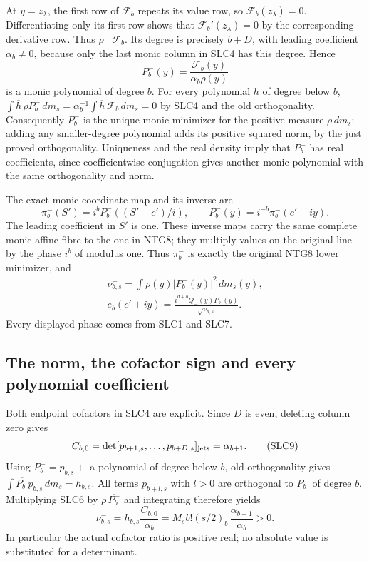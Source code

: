 \documentclass[11pt,a4paper]{article}
\begin{document}
At $y=z_\lambda$, the first row of $\mathcal F_b$ repeats its
value row, so $\mathcal F_b(z_\lambda)=0$. Differentiating only
its first row shows that $\mathcal F_b'(z_\lambda)=0$ by the
corresponding derivative row. Thus $\rho\mid \mathcal F_b$.
Its degree is precisely $b+D$, with leading coefficient
$\alpha_b\ne0$, because only the last monic column in
SLC4 has this degree. Hence
\[
                 P_b^-(y)=\frac{\mathcal F_b(y)}{\alpha_b\rho(y)}
                                                               \tag{SLC6}
\]
is a monic polynomial of degree $b$. For every polynomial
$h$ of degree below $b$,
$\int\overline h\,\rho P_b^-\,dm_s
=\alpha_b^{-1}\int\overline h\,\mathcal F_b\,dm_s=0$
by SLC4 and the old orthogonality. Consequently
$P_b^-$ is the unique monic minimizer for the positive
measure $\rho\,dm_s$: adding any smaller-degree polynomial
adds its positive squared norm, by the just proved
orthogonality. Uniqueness and the real density imply that
$P_b^-$ has real coefficients, since coefficientwise
conjugation gives another monic polynomial with the
same orthogonality and norm.

The exact monic coordinate map and its inverse are
\[
 \pi_b^-(S')=i^bP_b^-((S'-c')/i),\qquad
 P_b^-(y)=i^{-b}\pi_b^-(c'+iy).
                                                               \tag{SLC7}
\]
The leading coefficient in $S'$ is one. These inverse
maps carry the same complete monic affine fibre to the
one in NTG8; they multiply values on the original line
by the phase $i^b$ of modulus one. Thus $\pi_b^-$ is
exactly the original NTG8 lower minimizer, and
\[
\begin{gathered}
 \nu_{b,s}^-=\int\rho(y)|P_b^-(y)|^2\,dm_s(y),\\
 e_b(c'+iy)=
        \frac{i^{d+b}Q_-(y)P_b^-(y)}{\sqrt{\nu_{b,s}^-}}.
\end{gathered}                                                    \tag{SLC8}
\]
Every displayed phase comes from SLC1 and SLC7.

\subsection{The norm, the cofactor sign and every polynomial coefficient}
Both endpoint cofactors in SLC4 are explicit. Since $D$
is even, deleting column zero gives
\[
 C_{b,0}=\det[p_{b+1,s},\ldots,p_{b+D,s}]_{\rm jets}
                    =\alpha_{b+1}.
                                                               \tag{SLC9}
\]
Using $P_b^-=p_{b,s}+$ a polynomial of degree below $b$,
old orthogonality gives
$\int\overline{P_b^-}p_{b,s}\,dm_s=h_{b,s}$.
All terms $p_{b+l,s}$ with $l>0$ are orthogonal to
$P_b^-$ of degree $b$. Multiplying SLC6 by
$\rho\,\overline{P_b^-}$ and integrating therefore yields
\[
 \boxed{\quad
 \nu_{b,s}^-
       =h_{b,s}\frac{C_{b,0}}{\alpha_b}
       =M_sb!(s/2)_b\,\frac{\alpha_{b+1}}{\alpha_b}>0 .
 \quad}                                                        \tag{SLC10}
\]
In particular the actual cofactor ratio is positive real;
no absolute value is substituted for a determinant.
\end{document}
